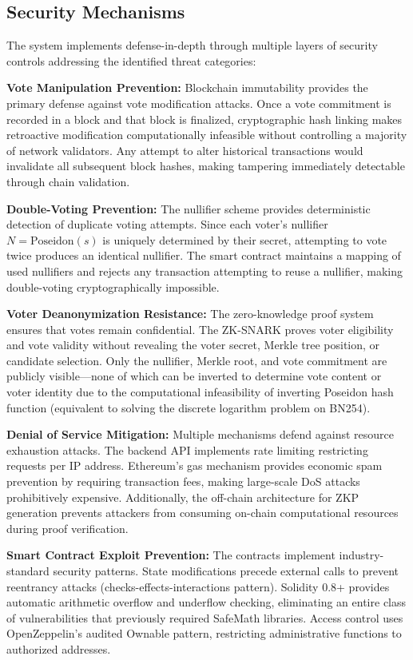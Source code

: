 \documentclass[conference]{IEEEtran}
\begin{document}
\subsection{Security Mechanisms}

The system implements defense-in-depth through multiple layers of security controls addressing the identified threat categories:

\textbf{Vote Manipulation Prevention:} Blockchain immutability provides the primary defense against vote modification attacks. Once a vote commitment is recorded in a block and that block is finalized, cryptographic hash linking makes retroactive modification computationally infeasible without controlling a majority of network validators. Any attempt to alter historical transactions would invalidate all subsequent block hashes, making tampering immediately detectable through chain validation.

\textbf{Double-Voting Prevention:} The nullifier scheme provides deterministic detection of duplicate voting attempts. Since each voter's nullifier $N = \text{Poseidon}(s)$ is uniquely determined by their secret, attempting to vote twice produces an identical nullifier. The smart contract maintains a mapping of used nullifiers and rejects any transaction attempting to reuse a nullifier, making double-voting cryptographically impossible.

\textbf{Voter Deanonymization Resistance:} The zero-knowledge proof system ensures that votes remain confidential. The ZK-SNARK proves voter eligibility and vote validity without revealing the voter secret, Merkle tree position, or candidate selection. Only the nullifier, Merkle root, and vote commitment are publicly visible---none of which can be inverted to determine vote content or voter identity due to the computational infeasibility of inverting Poseidon hash function (equivalent to solving the discrete logarithm problem on BN254).

\textbf{Denial of Service Mitigation:} Multiple mechanisms defend against resource exhaustion attacks. The backend API implements rate limiting restricting requests per IP address. Ethereum's gas mechanism provides economic spam prevention by requiring transaction fees, making large-scale DoS attacks prohibitively expensive. Additionally, the off-chain architecture for ZKP generation prevents attackers from consuming on-chain computational resources during proof verification.

\textbf{Smart Contract Exploit Prevention:} The contracts implement industry-standard security patterns. State modifications precede external calls to prevent reentrancy attacks (checks-effects-interactions pattern). Solidity 0.8+ provides automatic arithmetic overflow and underflow checking, eliminating an entire class of vulnerabilities that previously required SafeMath libraries. Access control uses OpenZeppelin's audited Ownable pattern, restricting administrative functions to authorized addresses.
\end{document}
